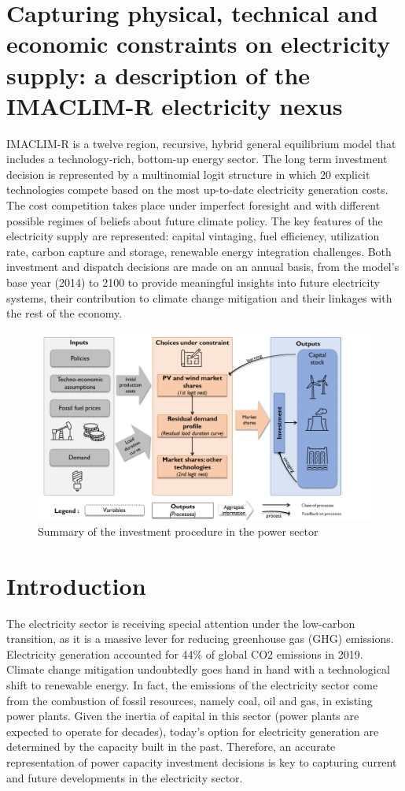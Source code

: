 \section*{Capturing physical, technical and economic constraints on electricity supply: a description of the IMACLIM-R electricity nexus}

IMACLIM-R is a twelve region, recursive, hybrid general equilibrium model that includes a technology-rich, bottom-up energy sector.  The long term investment decision is represented by a multinomial logit structure in which 20 explicit technologies compete based on the most up-to-date electricity generation costs. The cost competition takes place under imperfect foresight and with different possible regimes of beliefs about future climate policy. The key features of the electricity supply are represented: capital vintaging, fuel efficiency, utilization rate, carbon capture and storage, renewable energy integration challenges.  Both investment and dispatch decisions are made on an annual basis, from the model's base year (2014) to 2100 to provide meaningful insights into future electricity systems, their contribution to climate change mitigation and their linkages with the rest of the economy.

\begin{figure}[H]
    \includegraphics[scale=0.45]{figures&tables/Summary_nexus.png}
    \centering
    \caption{Summary of the investment procedure in the power sector}
    \label{fig:suminv}
\end{figure}

\section{Introduction}
The electricity sector is receiving special attention under the low-carbon transition, as it is a massive lever for reducing greenhouse gas (GHG) emissions. Electricity generation accounted for 44\% of global CO2 emissions in 2019. Climate change mitigation undoubtedly goes hand in hand with a technological shift to renewable energy. In fact, the emissions of the electricity sector come from the combustion of fossil resources, namely coal, oil and gas, in existing power plants. Given the inertia of capital in this sector (power plants are expected to operate for decades), today's option for electricity generation are determined by the capacity built in the past. Therefore, an accurate representation of power capacity investment decisions is key to capturing current and future developments in the electricity sector.


